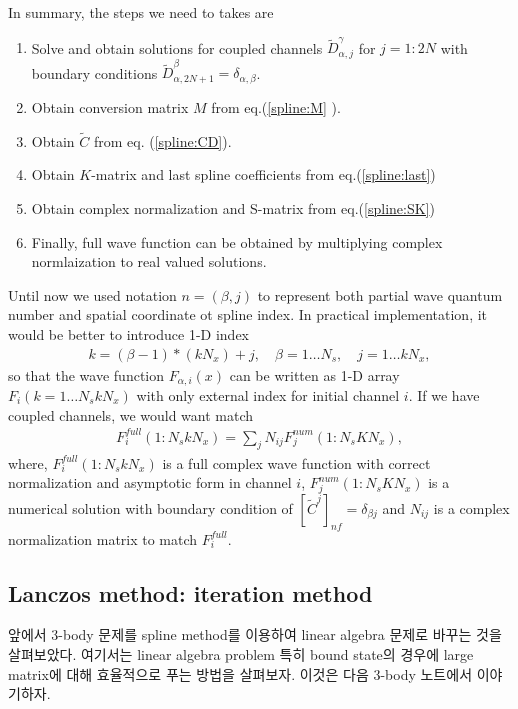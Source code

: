 \documentclass[10pt]{book}
\newcommand{\bea}{\begin{eqnarray}}
\newcommand{\eea}{\end{eqnarray}}
\begin{document}
In summary, the steps we need to takes are
\begin{enumerate}
\item Solve and obtain solutions for coupled channels
      $\tilde{D}^\gamma_{\alpha, j}$ for $j=1:2N$ 
      with boundary conditions
      $\tilde{D}^\beta_{\alpha,2N+1}= \delta_{\alpha,\beta}$. 

\item Obtain conversion matrix $M$ from eq.(\ref{spline:M} ).

\item Obtain $\tilde{C}$ from eq. (\ref{spline:CD}).

\item Obtain $K$-matrix and last spline coefficients from eq.(\ref{spline:last})

\item Obtain complex normalization and S-matrix from eq.(\ref{spline:SK})

\item Finally, full wave function can be obtained 
      by multiplying complex normlaization to real valued solutions. 
 
\end{enumerate}

Until now we used notation $n=(\beta,j)$ 
to represent both partial wave quantum number and
spatial coordinate ot spline index. In practical implementation, it would be better
to introduce 1-D index
\bea 
k=(\beta-1)*(k N_x)+j, \quad \beta=1\dots N_s,\quad j=1\dots k N_x,
\eea 
so that the wave function $F_{\alpha,i}(x)$ can be written as 1-D array
$F_i(k=1\dots N_s k N_x)$ with only external index for initial channel $i$.
If we have coupled channels, we would want match 
\bea 
F^{full}_i(1:N_s k N_x)=\sum_j N_{ij} F^{num}_{j}(1:N_s K N_x),
\eea   
where, $F^{full}_i(1:N_s k N_x)$ is a full complex wave function with correct 
normalization and asymptotic form in channel $i$,
$F^{num}_{j}(1:N_s K N_x)$ is a numerical solution with boundary 
condition of $[\tilde{C}^j]_{nf}=\delta_{\beta j}$ and $N_{ij}$
is a complex normalization matrix to match $F^{full}_i$. 


\subsection{Lanczos method: iteration method}
앞에서 3-body 문제를 spline method를 이용하여
linear algebra 문제로 바꾸는 것을 살펴보았다.
여기서는 linear algebra problem 특히 bound state의 경우에
large matrix에 대해 효율적으로 푸는 방법을 살펴보자. 이것은 다음 3-body 노트에서 이야기하자.
\end{document}

